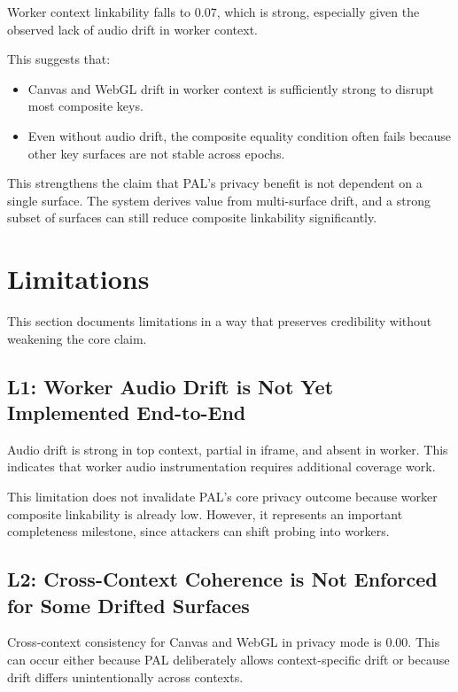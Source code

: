 \documentclass[11pt]{report}
\begin{document}
Worker context linkability falls to $0.07$, which is strong, especially given the observed lack of audio drift in worker context.

This suggests that:

\begin{itemize}
    \item Canvas and WebGL drift in worker context is sufficiently strong to disrupt most composite keys.
    \item Even without audio drift, the composite equality condition often fails because other key surfaces are not stable across epochs.
\end{itemize}

This strengthens the claim that PAL’s privacy benefit is not dependent on a single surface. The system derives value from multi-surface drift, and a strong subset of surfaces can still reduce composite linkability significantly.

\section{Limitations}

This section documents limitations in a way that preserves credibility without weakening the core claim.

\subsection{L1: Worker Audio Drift is Not Yet Implemented End-to-End}

Audio drift is strong in top context, partial in iframe, and absent in worker. This indicates that worker audio instrumentation requires additional coverage work.

This limitation does not invalidate PAL’s core privacy outcome because worker composite linkability is already low. However, it represents an important completeness milestone, since attackers can shift probing into workers.

\subsection{L2: Cross-Context Coherence is Not Enforced for Some Drifted Surfaces}

Cross-context consistency for Canvas and WebGL in privacy mode is $0.00$. This can occur either because PAL deliberately allows context-specific drift or because drift differs unintentionally across contexts.
\end{document}
